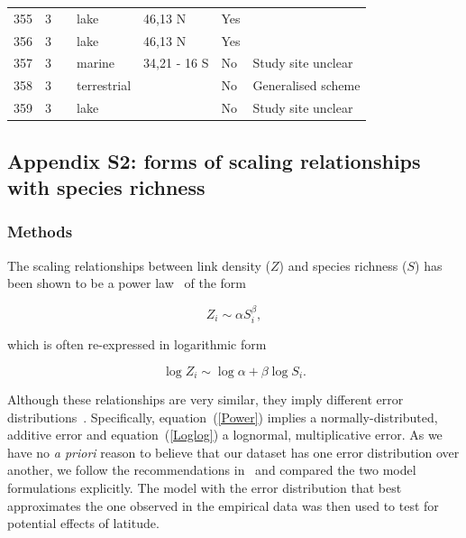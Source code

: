 \documentclass[12pt]{article}
\begin{document}
\begin{landscape}
\begin{table}[h!]
{\begin{tabular}{p{2.8cm}p{1.3cm}p{3cm}p{2.2cm}p{2.5cm}lp{8.2cm}}
        355   & 3 & \cite{Cohen2003}    & lake  & 46,13 N & Yes   &       \\
        356   & 3 & \cite{Cohen2003}    & lake  & 46,13 N & Yes   &       \\
        357   & 3 & \cite{Yodzis1998} & marine & 34,21 - 16 S & No    & Study site unclear \\
        358   & 3 & \cite{Schroter2003}  & terrestrial &       & No    & Generalised scheme \\
        359   & 3 & \cite{Baiser2012}  & lake  &       & No    & Study site unclear \\
        \hline
      \end{tabular}%
        }
    \end{table}%

  \end{landscape}
\newpage

\subsection*{Appendix S2: forms of scaling relationships with species richness}

  \subsubsection*{Methods}

    The scaling relationships between link density ($Z$) and species richness ($S$)
    has been shown to be a power law~\cite{Riede2010} of the form 

    \begin{equation}
    \label{Power}
    Z_{i} \sim \alpha S_{i}^{\beta}  ,
    \end{equation}

    \noindent which is often re-expressed in logarithmic form 

    \begin{equation}
    \label{Loglog}
    \log{Z_{i}} \sim \log{\alpha} + \beta\log{S_{i}}  .
    \end{equation}

    \noindent Although these relationships are very similar, they imply different error distributions~\cite{Xiao2011}.
    Specifically, equation~(\ref{Power}) implies a normally-distributed, additive 
    error and equation~(\ref{Loglog}) a lognormal,
    multiplicative error. As we have no \emph{a priori} reason to believe that our dataset 
    has one error distribution over another, we follow the recommendations in~\cite{Xiao2011} and compared the two
    model formulations explicitly. The model with the error distribution that best approximates the one
    observed in the empirical
    data was then used to test for potential effects of latitude.
\end{document}
